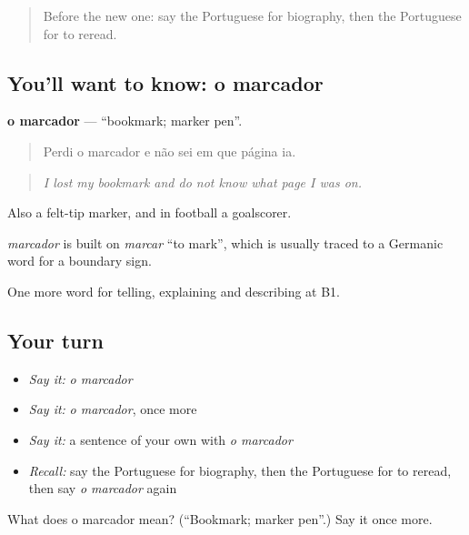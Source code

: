 \label{lesson:PT-C523-marcador}



\begin{quote}
Before the new one: say the Portuguese for biography, then the Portuguese for to reread.
\end{quote}

\subsection*{You'll want to know: o marcador}
\textbf{o marcador} — \textquotedblleft{}bookmark; marker pen\textquotedblright{}.

\begin{quote}
Perdi o marcador e não sei em que página ia.
\end{quote}

\begin{quote}
\emph{I lost my bookmark and do not know what page I was on.}
\end{quote}

Also a felt-tip marker, and in football a goalscorer.

\begin{cousinweb}
\emph{marcador} is built on \emph{marcar} \textquotedblleft{}to mark\textquotedblright{}, which is usually traced to a Germanic word for a boundary sign.
\end{cousinweb}

\begin{grammarlens}[title={What you've built}]
One more word for telling, explaining and describing at B1.
\end{grammarlens}

\subsection*{Your turn}
\begin{itemize}
\raggedright
  \item \emph{Say it:} \emph{o marcador}
  \item \emph{Say it:} \emph{o marcador}, once more
  \item \emph{Say it:} a sentence of your own with \emph{o marcador}
  \item \emph{Recall:} say the Portuguese for biography, then the Portuguese for to reread, then say \emph{o marcador} again
\end{itemize}

\begin{tcolorbox}[breakable,colback=teal!4,colframe=teal!35!black,title={Before you move on}]
What does o marcador mean? (\textquotedblleft{}Bookmark; marker pen\textquotedblright{}.) Say it once more.
\end{tcolorbox}
